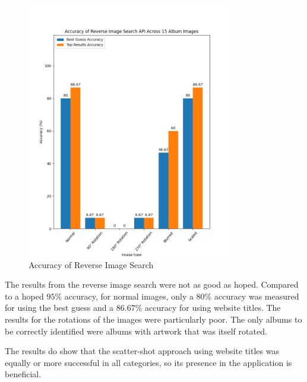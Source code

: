 \begin{figure} [H]
    \centering
    \includegraphics[width=0.8\textwidth]{figures/evaluation_graphs_ris.png}
    \caption{Accuracy of Reverse Image Search}
    \label{fig:album-scanning-results-ris}
\end{figure}

The results from the reverse image search were not as good as hoped. Compared to a hoped $95\%$ accuracy, for normal images, only a $80\%$ accuracy was measured for using the best guess and a $86.67\%$ accuracy for using website titles. The results for the rotations of the images were particularly poor. The only albums to be correctly identified were albums with artwork that was itself rotated.

The results do show that the scatter-shot approach using website titles was equally or more successful in all categories, so its presence in the application is beneficial.

